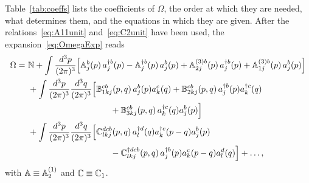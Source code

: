 Table~\ref{tab:coeffs} lists the coefficients of $\Omega$, the order at which they are needed, what determines them, and the equations in which they are given. After the relations~\eqref{eq:A11unit} and~\eqref{eq:C2unit} have been used, the expansion~\eqref{eq:OmegaExp} reads
\begin{align}\label{eq:OmegaFinal}
\Omega = \ &\mf{N}
+\int\frac{d^3p}{(2\pi)^3}\Big[\mf{A}^b_{j}(p)\,a^{\dagger b}_j(p)-\mf{A}^{\dagger b}_{j}(p)\,a^{b}_j(p)+\mf{A}^{(3)b}_{2j}(p)\,a^{\dagger b}_j(p)+\mf{A}^{(3)b}_{1j}(p)\,a^{b}_j(p)\Big]
\notag\\&
+\int\frac{d^3p}{(2\pi)^3}\frac{d^3q}{(2\pi)^3}\Big[\mf{B}^{cb}_{1kj}(p,q)\,a^b_j(p)a^c_k(q)+\mf{B}^{cb}_{2kj}(p,q)\,a^{\dagger b}_j(p)a^{\dagger c}_k(q)
\notag\\&\hspace{3.4cm}+\mf{B}^{cb}_{3kj}(p,q)\,a^{\dagger c}_k(q)a^b_j(p)\Big]
\notag\\&
+\int\frac{d^3p}{(2\pi)^3}\frac{d^3q}{(2\pi)^3}\Big[\mf{C}^{dcb}_{lkj}(p,q)\,a^{\dagger d}_l(q)a^{\dagger c}_k(p-q)a^b_j(p)
\notag\\&\hspace{3.4cm}-\mf{C}^{\dagger dcb}_{lkj}(p,q)\,a^{\dagger b}_j(p)a^c_k(p-q)a^d_l(q)\Big]+\dots,
\end{align}
with $\mathbb{A}\equiv\mathbb{A}^{(1)}_2$ and $\mathbb{C}\equiv\mathbb{C}_1$.

